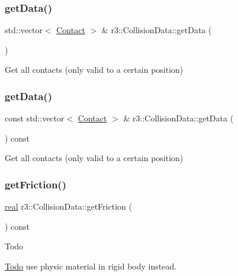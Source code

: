\subsubsection{\texorpdfstring{get\+Data()}{getData()}\hspace{0.1cm}{\footnotesize\ttfamily [1/2]}}
{\footnotesize\ttfamily std\+::vector$<$ \mbox{\hyperlink{classr3_1_1_contact}{Contact}} $>$ \& r3\+::\+Collision\+Data\+::get\+Data (\begin{DoxyParamCaption}{ }\end{DoxyParamCaption})}

Get all contacts (only valid to a certain position) \mbox{\label{classr3_1_1_collision_data_ab31745ebb708c1d04e22bcfb385e663f}} 
\subsubsection{\texorpdfstring{get\+Data()}{getData()}\hspace{0.1cm}{\footnotesize\ttfamily [2/2]}}
{\footnotesize\ttfamily const std\+::vector$<$ \mbox{\hyperlink{classr3_1_1_contact}{Contact}} $>$ \& r3\+::\+Collision\+Data\+::get\+Data (\begin{DoxyParamCaption}{ }\end{DoxyParamCaption}) const}

Get all contacts (only valid to a certain position) \mbox{\label{classr3_1_1_collision_data_ae610a57c20c504a7bacb4e35f89f530f}} 
\subsubsection{\texorpdfstring{get\+Friction()}{getFriction()}}
{\footnotesize\ttfamily \mbox{\hyperlink{namespacer3_ab2016b3e3f743fb735afce242f0dc1eb}{real}} r3\+::\+Collision\+Data\+::get\+Friction (\begin{DoxyParamCaption}{ }\end{DoxyParamCaption}) const\hspace{0.3cm}{\ttfamily [inline]}}

\begin{DoxyRefDesc}{Todo}
\item[\mbox{\hyperlink{todo__todo000009}{Todo}}]use physic material in rigid body instead. \end{DoxyRefDesc}
\mbox{\label{classr3_1_1_collision_data_a4fa1a70757353fe8ae2facc3762f5b2b}} 
